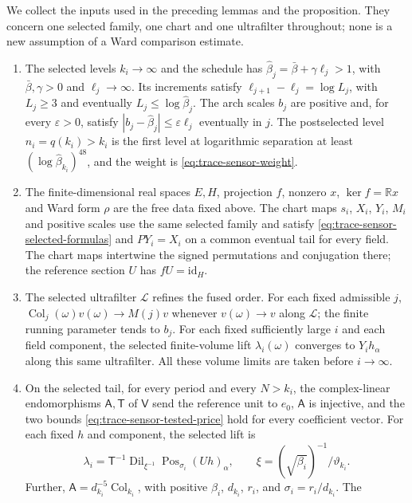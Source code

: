 We collect the inputs used in the preceding lemmas and the proposition.
They concern one selected family, one chart and one ultrafilter throughout;
none is a new assumption of a Ward comparison estimate.
\begin{enumerate}
\item[(S1)] The selected levels $k_i\to\infty$ and the schedule has
  $\widehat\beta_j=\bar\beta+\gamma\ell_j>1$, with $\bar\beta,\gamma>0$
  and $\ell_j\to\infty$. Its increments satisfy
  $\ell_{j+1}-\ell_j=\log L_j$, with $L_j\ge3$ and eventually
  $L_j\le\log\widehat\beta_j$. The arch scales $b_j$ are positive and,
  for every $\varepsilon>0$, satisfy
  $|b_j-\widehat\beta_j|\le\varepsilon\ell_j$ eventually in $j$.
  The postselected level $n_i=q(k_i)>k_i$ is the first level at logarithmic
  separation at least $(\log\widehat\beta_{k_i})^{48}$, and the weight is
  \eqref{eq:trace-sensor-weight}.
\item[(S2)] The finite-dimensional real spaces $E,H$, projection $f$,
  nonzero $x$, $\ker f=\mathbb Rx$ and Ward form $\rho$ are the free data
  fixed above. The chart maps $s_i$, $X_i$, $Y_i$, $M_i$ and positive scales
  use the same selected family and satisfy
  \eqref{eq:trace-sensor-selected-formulas} and $PY_i=X_i$ on a common
  eventual tail for every field. The chart maps intertwine the signed
  permutations and conjugation there; the reference section $U$ has
  $fU=\mathrm{id}_H$.
\item[(S3)] The selected ultrafilter $\mathcal L$ refines the fused order.
  For each fixed admissible $j$, $\operatorname{Col}_j(\omega)v(\omega)
  \to M(j)v$ whenever $v(\omega)\to v$ along $\mathcal L$; the finite
  running parameter tends to $b_j$. For each fixed sufficiently large $i$
  and each field component, the selected finite-volume lift
  $\lambda_i(\omega)$ converges to $Y_i h_\alpha$ along this same
  ultrafilter. All these volume limits are taken before $i\to\infty$.
\item[(S4)] On the selected tail, for every period and every $N>k_i$,
  the complex-linear endomorphisms $\mathsf A,\mathsf T$ of $\mathsf V$
  send the reference unit to $e_0$, $\mathsf A$ is injective, and the two
  bounds \eqref{eq:trace-sensor-tested-price} hold for every coefficient
  vector. For each fixed $h$ and component, the selected lift is
  \[\lambda_i=\mathsf T^{-1}\operatorname{Dil}_{\xi^{-1}}
  \operatorname{Pos}_{\sigma_i}(Uh)_\alpha,\qquad
  \xi=(\sqrt{\beta_i})^{-1}/\vartheta_{k_i}.\]
  Further,
  $\mathsf A=d_{k_i}^{-5}\operatorname{Col}_{k_i}$, with positive
  $\beta_i$, $d_{k_i}$, $r_i$, and $\sigma_i=r_i/d_{k_i}$. The

\end{enumerate}
